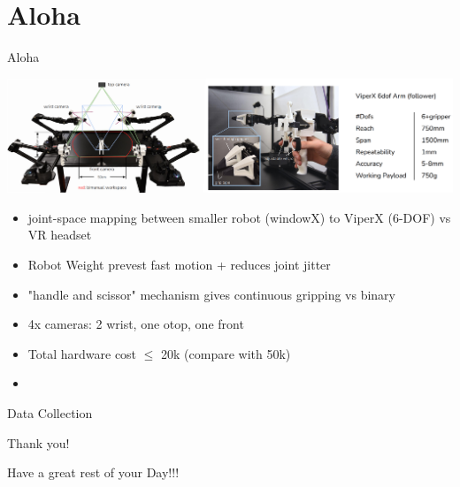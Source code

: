 \documentclass{beamer}
\begin{document}
\section{Aloha}
\begin{frame}[t]{Aloha}
    \begin{center}
        \includegraphics[width=1.0\textwidth]{./img/aloha_hw.png}
    \end{center}
    \begin{itemize}[label=-]
        \item joint-space mapping between smaller robot (windowX) to ViperX (6-DOF) vs VR headset
        \item Robot Weight prevest fast motion + reduces joint jitter 
        \item "handle and scissor" mechanism gives continuous gripping vs binary
        \item 4x cameras: 2 wrist, one otop, one front
        \item Total hardware cost $\leq$ 20k (compare with 50k)
        \item 
    
    \end{itemize}
\end{frame}

\begin{frame}[t]{Data Collection}
    
\end{frame}
\begin{frame}{Thank you!}
	\begin{center}
        Have a great rest of your Day!!!
	\end{center}
	\begin{center}
	\end{center}
\end{frame}
\end{document}
